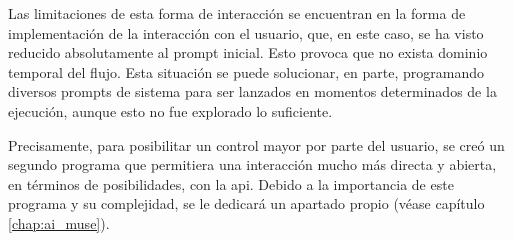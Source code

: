 Las limitaciones de esta forma de interacción se encuentran en la forma de implementación de la interacción con el usuario, que, en este caso, se ha visto reducido absolutamente al prompt inicial. Esto provoca que no exista dominio temporal del flujo. Esta situación se puede solucionar, en parte, programando diversos prompts de sistema para ser lanzados en momentos determinados de la ejecución, aunque esto no fue explorado lo suficiente.

Precisamente, para posibilitar un control mayor por parte del usuario, se creó un segundo programa que permitiera una interacción mucho más directa y abierta, en términos de posibilidades, con la \gls{api}. Debido a la importancia de este programa y su complejidad, se le dedicará un apartado propio (véase capítulo \ref{chap:ai_muse}).

